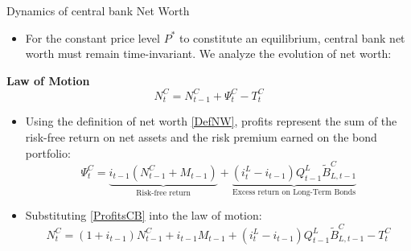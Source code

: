\documentclass[11pt,aspectratio=169]{beamer}
\begin{document}
\begin{frame}[label=Net]{Dynamics of central bank  Net Worth}
\small

\begin{itemize}
    \item For the constant price level $P^*$ to constitute an equilibrium, central bank  net worth must remain time-invariant. We analyze the evolution of net worth:
\end{itemize}
\textbf{Law of Motion}
    \begin{equation*}
        N_{t}^{C} = N_{t-1}^{C} + \Psi _{t}^{C} - T_{t}^{C} \label{NA_base}
    \end{equation*}
    \begin{itemize}
    \item Using the definition of net worth \eqref{DefNW}, profits represent the sum of the risk-free return on net assets and the risk premium earned on the bond portfolio:
    \begin{equation}
        \Psi _{t}^{C} = \underbrace{i_{t-1}(N_{t-1}^{C}+M_{t-1})}_{\text{Risk-free return}} + \underbrace{(i_{t}^{L}-i_{t-1})Q_{t-1}^{L}\tilde{B}_{L,t-1}^{C}}_{\text{Excess return on Long-Term Bonds}} \label{ProfitsCB}
    \end{equation}
    \item Substituting \eqref{ProfitsCB} into the law of motion:
    \begin{equation}
        N_{t}^{C} = (1+i_{t-1})N_{t-1}^{C} + i_{t-1}M_{t-1} + (i_{t}^{L}-i_{t-1})Q_{t-1}^{L}\tilde{B}_{L,t-1}^{C} - T_{t}^{C} \label{NA}
    \end{equation}
\end{itemize}
\end{frame}
\end{document}
